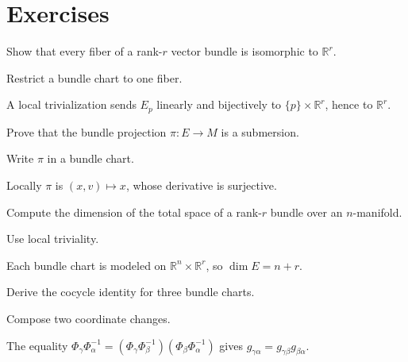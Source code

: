\section{Exercises}

\begin{exercise}\label{exr:vii07-01}
Show that every fiber of a rank-\(r\) vector bundle is isomorphic to \(\mathbb R^r\).
\end{exercise}
\begin{hint}
Restrict a bundle chart to one fiber.
\end{hint}
\begin{solution}
A local trivialization sends \(E_p\) linearly and bijectively to \(\{p\}\times\mathbb R^r\), hence to \(\mathbb R^r\).
\end{solution}

\begin{exercise}\label{exr:vii07-02}
Prove that the bundle projection \(\pi:E\to M\) is a submersion.
\end{exercise}
\begin{hint}
Write \(\pi\) in a bundle chart.
\end{hint}
\begin{solution}
Locally \(\pi\) is \((x,v)\mapsto x\), whose derivative is surjective.
\end{solution}

\begin{exercise}\label{exr:vii07-03}
Compute the dimension of the total space of a rank-\(r\) bundle over an \(n\)-manifold.
\end{exercise}
\begin{hint}
Use local triviality.
\end{hint}
\begin{solution}
Each bundle chart is modeled on \(\mathbb R^n\times\mathbb R^r\), so \(\dim E=n+r\).
\end{solution}

\begin{exercise}\label{exr:vii07-04}
Derive the cocycle identity for three bundle charts.
\end{exercise}
\begin{hint}
Compose two coordinate changes.
\end{hint}
\begin{solution}
The equality \(\Phi_\gamma\Phi_\alpha^{-1}=(\Phi_\gamma\Phi_\beta^{-1})(\Phi_\beta\Phi_\alpha^{-1})\) gives \(g_{\gamma\alpha}=g_{\gamma\beta}g_{\beta\alpha}\).
\end{solution}

